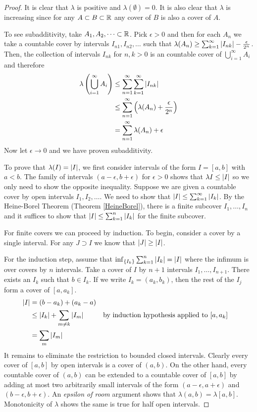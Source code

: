 \begin{proof}It is clear that $\lambda$ is positive and $\lambda(\emptyset) = 0$.  It is also
  clear that $\lambda$ is increasing since for any $A \subset B
  \subset \mathbb{R}$ any cover of $B$ is also a cover of $A$.  

To see subadditivity, take $A_1, A_2, \dots \subset \mathbb{R}$.  Pick
$\epsilon > 0$ and then for each $A_n$ we take a countable cover by intervals
$I_{n1}, I_{n2}, \dots$ such that $\lambda(A_n) \geq \sum_{k=1}^\infty
\left \vert I_{nk} \right \vert - \frac{\epsilon}{2^n}$.  Then, the collection of
intervals $I_{nk}$ for $n,k > 0$ is an countable cover of
$\bigcup_{i=1}^\infty A_i$ and therefore
\begin{align*}
\lambda \left (\bigcup_{i=1}^\infty A_i \right ) &\leq
\sum_{n=1}^\infty \sum_{k=1}^\infty \left \vert I_{nk} \right \vert \\
&\leq \sum_{n=1}^\infty \left ( \lambda(A_n) + \frac{\epsilon}{2^n}
\right )\\
&= \sum_{n=1}^\infty \lambda(A_n) + \epsilon
\end{align*}
Now let $\epsilon \to 0$ and we have proven subadditivity.

To prove that $\lambda(I) = \left \vert I \right \vert$, we first consider intervals of
the form $I = [a,b]$ with $a < b$.  The family of intervals $(a -
\epsilon, b+\epsilon)$ for $\epsilon > 0$ shows that $\lambda{I} \leq
\left \vert I \right \vert$ so we only need to show the opposite inequality.
Suppose we are given a countable cover by open intervals $I_1, I_2,
\dots$.  We need to show that $\left \vert I \right \vert \leq \sum_{k=1}^\infty \left \vert I_k \right \vert$.
By the Heine-Borel Theorem (Theorem \ref{HeineBorel}), there
is a finite subcover $I_1, \dots, I_n$ and it suffices to show
that $\left \vert I \right \vert \leq \sum_{k=1}^n \left \vert I_k \right \vert$ for the finite subcover.

For finite covers we
can proceed by induction.  To begin, consider a cover by a single
interval.  For any $J \supset I$ we know that
$\left \vert J \right \vert \geq \left \vert I \right \vert$.

For the induction step, assume that $\inf_{\{I_k\}} \sum_{k=1}^n
\left \vert I_k \right \vert = \left \vert I \right \vert$ where the infimum is over covers by $n$
intervals.  Take a cover of $I$ by $n+1$ intervals $I_1, \dots,
I_{n+1}$.  There exists an $I_k$ such that $b \in I_k$.  If we write
$I_k = (a_k,b_k)$, then the rest of the $I_j$ form a cover of
$[a,a_k]$.
\begin{align*}
\left \vert I \right \vert &= (b-a_k) + (a_k - a) \\
&\leq \left \vert I_k \right \vert + \sum_{m \neq k} \left \vert I_m \right \vert & &\text{by induction
  hypothesis applied to $[a,a_k]$} \\
&=\sum_m \left \vert I_m \right \vert
\end{align*}
It remains to eliminate the restriction to bounded closed intervals.
Clearly every cover of 
$[a,b]$ by open intervals is a cover of $(a,b)$.  On the other hand, every countable cover of $(a,b)$ can be extended to a countable cover of $[a,b]$ by adding
at most two arbitrarily small intervals of the form
$(a-\epsilon,a+\epsilon)$ and $(b-\epsilon,b+\epsilon)$.  An
\emph{epsilon of room} argument shows that $\lambda (a,b) = \lambda
[a,b]$.  Monotonicity of $\lambda$ shows the same is true for half
open intervals.



\end{proof}

